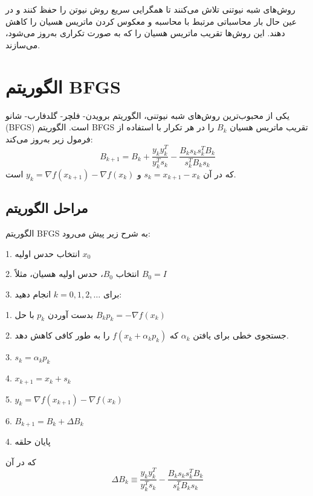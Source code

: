 \documentclass{article}
\begin{document}
روش‌های شبه نیوتنی تلاش می‌کنند تا همگرایی سریع روش نیوتن را حفظ کنند و در عین حال بار محاسباتی مرتبط با محاسبه و معکوس کردن ماتریس هسیان را کاهش دهند. این روش‌ها تقریب ماتریس هسیان را که به صورت تکراری به‌روز می‌شود، می‌سازند.

\section{الگوریتم BFGS}

یکی از محبوب‌ترین روش‌های شبه نیوتنی، الگوریتم برویدن- فلچر- گلدفارب- شانو (BFGS) است. الگوریتم BFGS تقریب ماتریس هسیان \( B_k \) را در هر تکرار با استفاده از فرمول زیر به‌روز می‌کند:
\begin{equation}
B_{k+1} = B_k + \frac{y_k y_k^T}{y_k^T s_k} - \frac{B_k s_k s_k^T B_k}{s_k^T B_k s_k}
\end{equation}
که در آن \( s_k = x_{k+1} - x_k \) و \( y_k = \nabla f(x_{k+1}) - \nabla f(x_k) \) است.

\subsection{مراحل الگوریتم}

الگوریتم BFGS به شرح زیر پیش می‌رود:

1. انتخاب حدس اولیه \( x_0 \)

2. انتخاب \( B_0 \)، حدس اولیه هسیان، مثلاً \( B_0 = I \)

3. برای \( k = 0, 1, 2, \ldots \) انجام دهید:

\hspace{0.5cm} 1. بدست آوردن \( p_k \)  با حل \( B_k p_k = -\nabla f (x_k) \)

\hspace{0.5cm} 2. جستجوی خطی برای یافتن \( \alpha_k \) که \( f(x_k + \alpha_k p_k) \) را به طور کافی کاهش دهد.

\hspace{0.5cm} 3. \( s_k = \alpha_k p_k \)

\hspace{0.5cm} 4. \( x_{k+1} = x_k + s_k \)

\hspace{0.5cm} 5. \( y_k = \nabla f(x_{k+1}) - \nabla f(x_k) \)

\hspace{0.5cm} 6. \( B_{k+1} = B_k + \Delta B_k \)

4. پایان حلقه

که در آن
\begin{equation}
\Delta B_k \equiv \frac{y_k y_k^T}{y_k^T s_k} - \frac{B_k s_k s_k^T B_k}{s_k^T B_k s_k}
\end{equation}
\end{document}
